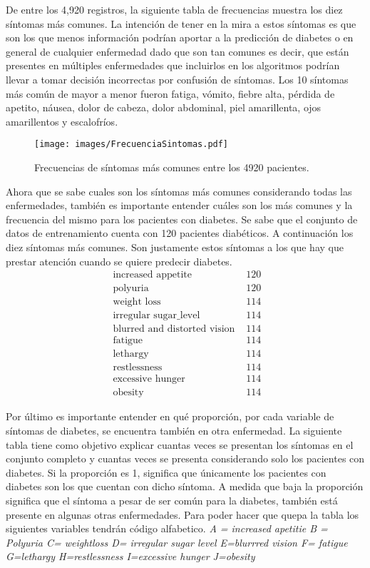 \documentclass[twocolumn]{bmcart}%
\begin{document}
De entre los 4,920 registros, la siguiente tabla de frecuencias muestra los diez síntomas más comunes. La intención de tener en la mira a estos síntomas es que son los que menos información podrían aportar a la predicción de diabetes o en general de cualquier enfermedad dado que son tan comunes es decir, que están presentes en múltiples enfermedades que incluirlos en los algoritmos podrían llevar a tomar decisión incorrectas por confusión de síntomas. Los 10 síntomas más común de mayor a menor fueron fatiga, vómito, fiebre alta, pérdida de apetito, náusea, dolor de cabeza, dolor abdominal, piel amarillenta, ojos amarillentos y escalofríos. 

\begin{figure}[h!]
  \caption{\csentence{}
      Frecuencias de síntomas más comunes entre los 4920 pacientes.}
\texttt{[image: images/FrecuenciaSintomas.pdf]}  
      \end{figure}

Ahora que se sabe cuales son los síntomas más comunes considerando todas las enfermedades, también es importante entender cuáles son los más comunes y la frecuencia del mismo para los pacientes con diabetes. Se sabe que el conjunto de datos de entrenamiento cuenta con 120 pacientes diabéticos. A continuación los diez síntomas más comunes. Son justamente estos síntomas a los que hay que prestar atención cuando se quiere predecir diabetes. 
$$
\begin{array}{ll}
\text { increased appetite } & 120 \\
\text { polyuria } & 120 \\
\text { weight loss } & 114 \\
\text { irregular sugar_level } & 114 \\
\text { blurred and distorted vision } & 114 \\
\text { fatigue } & 114 \\
\text { lethargy } & 114 \\
\text { restlessness } & 114 \\
\text { excessive hunger } & 114 \\
\text { obesity } & 114
\end{array}
$$

Por último es importante entender en qué proporción, por cada variable de síntomas de diabetes, se encuentra también en otra enfermedad. La siguiente tabla tiene como objetivo explicar cuantas veces se presentan los síntomas en el conjunto completo y cuantas veces se presenta considerando solo los pacientes con diabetes. Si la proporción es 1, significa que únicamente los pacientes con diabetes son los que cuentan con dicho síntoma. A medida que baja la proporción significa que el síntoma a pesar de ser común para la diabetes, también está presente en algunas otras enfermedades. Para poder hacer que quepa la tabla los siguientes variables tendrán código alfabetico.\textit{ A = increased apetitie B = Polyuria C= weightloss D= irregular sugar level E=blurrred vision F= fatigue G=lethargy H=restlessness I=excessive hunger J=obesity}
\end{document}
